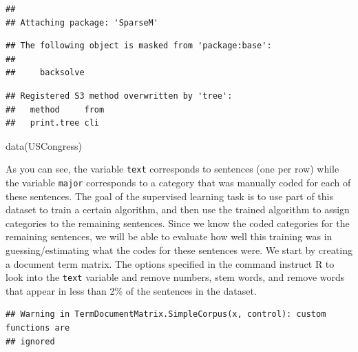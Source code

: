 \documentclass[
]{book}
\newenvironment{Shaded}{\begin{snugshade}}{\end{snugshade}}
\newcommand{\AttributeTok}[1]{\textcolor[rgb]{0.77,0.63,0.00}{#1}}
\newcommand{\ConstantTok}[1]{\textcolor[rgb]{0.00,0.00,0.00}{#1}}
\newcommand{\FloatTok}[1]{\textcolor[rgb]{0.00,0.00,0.81}{#1}}
\newcommand{\FunctionTok}[1]{\textcolor[rgb]{0.00,0.00,0.00}{#1}}
\newcommand{\NormalTok}[1]{#1}
\newcommand{\OtherTok}[1]{\textcolor[rgb]{0.56,0.35,0.01}{#1}}
\newcommand{\SpecialCharTok}[1]{\textcolor[rgb]{0.00,0.00,0.00}{#1}}
\newcommand{\StringTok}[1]{\textcolor[rgb]{0.31,0.60,0.02}{#1}}
\begin{document}
\begin{verbatim}
## 
## Attaching package: 'SparseM'
\end{verbatim}

\begin{verbatim}
## The following object is masked from 'package:base':
## 
##     backsolve
\end{verbatim}

\begin{verbatim}
## Registered S3 method overwritten by 'tree':
##   method     from
##   print.tree cli
\end{verbatim}

\begin{Shaded}
\begin{Highlighting}[]
\FunctionTok{data}\NormalTok{(USCongress)}
\end{Highlighting}
\end{Shaded}

As you can see, the variable \texttt{text} corresponds to sentences (one per row) while the variable \texttt{major} corresponds to a category that was manually coded for each of these sentences. The goal of the supervised learning task is to use part of this dataset to train a certain algorithm, and then use the trained algorithm to assign categories to the remaining sentences. Since we know the coded categories for the remaining sentences, we will be able to evaluate how well this training was in guessing/estimating what the codes for these sentences were. We start by creating a document term matrix. The options specified in the command instruct R to look into the \texttt{text} variable and remove numbers, stem words, and remove words that appear in less than 2\% of the sentences in the dataset.

\begin{Shaded}
\end{Shaded}

\begin{verbatim}
## Warning in TermDocumentMatrix.SimpleCorpus(x, control): custom functions are
## ignored
\end{verbatim}
\end{document}
